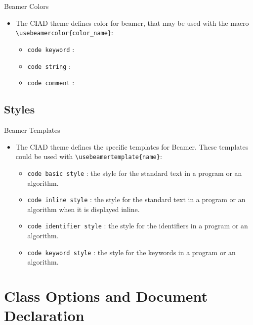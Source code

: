 \documentclass[english,sectioncirclenumberstyle]{ciadbeamer}
\begin{document}
\begin{frame}{Beamer Colors}
	\begin{itemize}
	\item The CIAD theme defines color for beamer, that may be used with the macro \texttt{{\textbackslash}usebeamercolor\{color\_name\}}:
		\begin{itemize}
		\item \texttt{code keyword} : 
		\vfill
		\item \texttt{code string} : 
		\vfill
		\item \texttt{code comment} : 
		\end{itemize}
	\end{itemize}
\end{frame}

\subsection{Styles}
\begin{frame}{Beamer Templates}
	\begin{itemize}
	\item The CIAD theme defines the specific templates for Beamer. These templates could be used with 
		\texttt{{\textbackslash}usebeamertemplate\{name\}}:
		\begin{itemize}
		\item \texttt{code basic style} : the style for the standard text in a program or an algorithm. 
		\vfill
		\item \texttt{code inline style} : the style for the standard text in a program or an algorithm when it is displayed inline. 
		\vfill
		\item \texttt{code identifier style} : the style for the identifiers in a program or an algorithm. 
		\vfill
		\item \texttt{code keyword style} : the style for the keywords in a program or an algorithm. 
		\end{itemize}
	\end{itemize}
\end{frame}

\section{Class Options and Document Declaration}
\tableofcontentslide[sectionstyle={show/shaded},subsectionstyle={show/show/hide},subsubsectionstyle={hide/hide/hide/hide},sections={1-6}]
\end{document}
